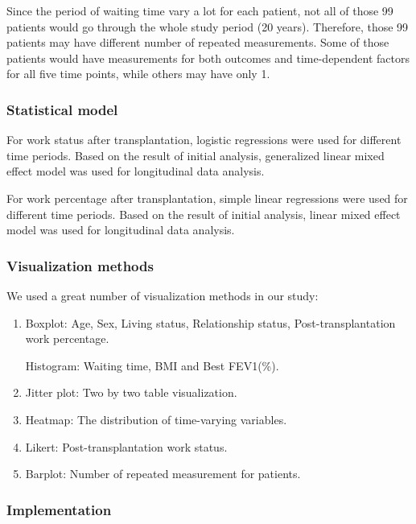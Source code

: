 \documentclass[11pt, a4paper]{article}\usepackage[]{graphicx}\usepackage[]{color}
\begin{document}
Since the period of waiting time vary a lot for each patient, not all of those 99 patients would go through the
whole study period (20 years). Therefore, those 99 patients may have different number of repeated measurements. Some of those patients would have measurements for both outcomes and time-dependent factors for all five time points, while others may have only 1.

\vspace{0.5cm}
\subsubsection*{Statistical model}

For work status after transplantation, logistic regressions were used for different time periods. Based on the result of initial analysis, generalized linear mixed effect model was used for longitudinal data analysis.

For work percentage after transplantation, simple linear regressions were used for different time periods. Based on the result of initial analysis, linear mixed effect model was  used for longitudinal data analysis.


\vspace{0.5cm}
\subsubsection*{Visualization methods}
We used a great number of visualization methods in our study:

\begin{enumerate}
\item Boxplot: Age, Sex, Living status, Relationship status, Post-transplantation work percentage.

\itemn Histogram: Waiting time, BMI and Best FEV1(\%).

\item Jitter plot: Two by two table visualization.

\item Heatmap: The distribution of time-varying variables.

\item Likert: Post-transplantation work status.

\item Barplot: Number of repeated measurement for patients.

\end{enumerate}
\vspace{0.5cm}
\subsubsection*{Implementation}
\end{document}
